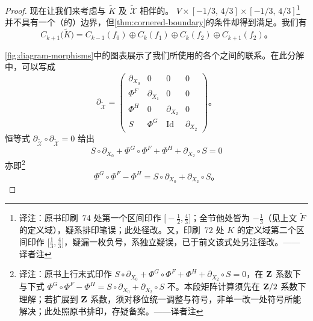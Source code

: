 \begin{proof}
现在让我们来考虑与 $\widetilde{K}$ 及 $\widetilde{\mathcal{X}}$ 相伴的\trCriticalPoint{}\trComplex。\trManifold{} $V\times[-1/3,\,4/3]\times[-1/3,\,4/3]$\footnote{译注：原书印刷~74 处第一个区间印作 $\bigl[-\tfrac{1}{2},\tfrac{4}{3}\bigr]$；全节他处皆为 $-\tfrac{1}{3}$（见上文 $\widetilde{F}$ 的定义域），疑系排印笔误；此处径改。又，印刷~72 处 $K$ 的定义域第二个区间印作 $\bigl[\tfrac{1}{3},\tfrac{4}{3}\bigr]$，疑漏一枚负号，系独立疑误，已于前文该式处另注径改。——译者注}并不具有一个（\trSmooth{}的）边界，但\cref{thm:cornered-boundary}的条件却得到满足。我们有
\[
C_{k+1}\bigl(\widetilde{K}\bigr)
  =C_{k-1}(f_0)\oplus C_k(f_1)\oplus C_k(f_2)\oplus C_{k+1}(f_2)\text{。}
\]

\cref{fig:diagram-morphisms}中的图表展示了我们所使用的各个\trMorphism{}之间的联系。在此分解中，\trDifferential{}可以写成
\[
\partial_{\widetilde{\mathcal{X}}}=
\begin{pmatrix}
\partial_{X_0} & 0 & 0 & 0\\
\Phi^F & \partial_{X_1} & 0 & 0\\
\Phi^H & 0 & \partial_{X_2} & 0\\
S & \Phi^G & \operatorname{Id} & \partial_{X_2}
\end{pmatrix}\text{。}
\]
恒等式 $\partial_{\widetilde{\mathcal{X}}}\circ\partial_{\widetilde{\mathcal{X}}}=0$ 给出
\[
S\circ\partial_{X_0}+\Phi^G\circ\Phi^F+\Phi^H+\partial_{X_2}\circ S=0
\]
亦即\footnote{译注：原书上行末式印作 $S\circ\partial_{X_0}+\Phi^G\circ\Phi^F+\Phi^H+\partial_{X_2}\circ S=0$，在 $\mathbf{Z}$ 系数下与下式 $\Phi^G\circ\Phi^F-\Phi^H=S\circ\partial_{X_0}+\partial_{X_2}\circ S$ 不\trCompatible。本段矩阵计算须先在 $\mathbf{Z}/2$ 系数下理解；若扩展到 $\mathbf{Z}$ 系数，须对移位\trComplex{}统一调整\trOrientation{}与\trHomotopy{}符号，非单一改一处符号所能解决；此处照原书排印，存疑备案。——译者注}
\[
\Phi^G\circ\Phi^F-\Phi^H=S\circ\partial_{X_0}+\partial_{X_2}\circ S\text{。}
\]


\end{proof}
